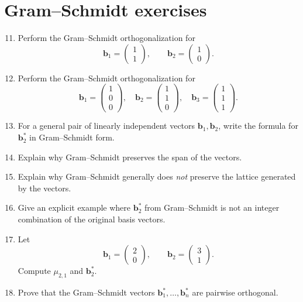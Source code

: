 \documentclass[11pt]{article}
\begin{document}
\section{Gram--Schmidt exercises}

\begin{enumerate}
	\setcounter{enumi}{10}
	\item Perform the Gram--Schmidt orthogonalization for
	\[
	\mathbf{b}_1=
	\begin{pmatrix}
		1\\1
	\end{pmatrix},
	\qquad
	\mathbf{b}_2=
	\begin{pmatrix}
		1\\0
	\end{pmatrix}.
	\]
	
	\item Perform the Gram--Schmidt orthogonalization for
	\[
	\mathbf{b}_1=
	\begin{pmatrix}
		1\\0\\0
	\end{pmatrix},
	\quad
	\mathbf{b}_2=
	\begin{pmatrix}
		1\\1\\0
	\end{pmatrix},
	\quad
	\mathbf{b}_3=
	\begin{pmatrix}
		1\\1\\1
	\end{pmatrix}.
	\]
	
	\item For a general pair of linearly independent vectors \(\mathbf{b}_1,\mathbf{b}_2\), write the formula for \(\mathbf{b}_2^*\) in Gram--Schmidt form.
	
	\item Explain why Gram--Schmidt preserves the span of the vectors.
	
	\item Explain why Gram--Schmidt generally does \emph{not} preserve the lattice generated by the vectors.
	
	\item Give an explicit example where \(\mathbf{b}_2^*\) from Gram--Schmidt is not an integer combination of the original basis vectors.
	
	\item Let
	\[
	\mathbf{b}_1=
	\begin{pmatrix}
		2\\0
	\end{pmatrix},
	\qquad
	\mathbf{b}_2=
	\begin{pmatrix}
		3\\1
	\end{pmatrix}.
	\]
	Compute \(\mu_{2,1}\) and \(\mathbf{b}_2^*\).
	
	\item Prove that the Gram--Schmidt vectors \(\mathbf{b}_1^*,\dots,\mathbf{b}_n^*\) are pairwise orthogonal.
\end{enumerate}
\end{document}

